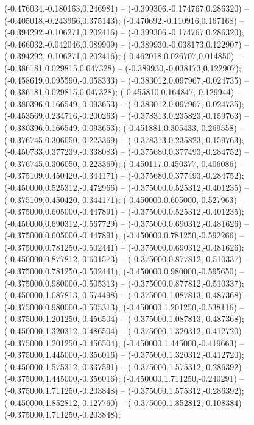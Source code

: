  (-0.476034,-0.180163,0.246981) -- (-0.399306,-0.174767,0.286320) -- (-0.405018,-0.243966,0.375143);
 (-0.470692,-0.110916,0.167168) -- (-0.394292,-0.106271,0.202416) -- (-0.399306,-0.174767,0.286320);
 (-0.466032,-0.042046,0.089909) -- (-0.389930,-0.038173,0.122907) -- (-0.394292,-0.106271,0.202416);
 (-0.462018,0.026707,0.014850) -- (-0.386181,0.029815,0.047328) -- (-0.389930,-0.038173,0.122907);
 (-0.458619,0.095590,-0.058333) -- (-0.383012,0.097967,-0.024735) -- (-0.386181,0.029815,0.047328);
 (-0.455810,0.164847,-0.129944) -- (-0.380396,0.166549,-0.093653) -- (-0.383012,0.097967,-0.024735);
 (-0.453569,0.234716,-0.200263) -- (-0.378313,0.235823,-0.159763) -- (-0.380396,0.166549,-0.093653);
 (-0.451881,0.305433,-0.269558) -- (-0.376745,0.306050,-0.223369) -- (-0.378313,0.235823,-0.159763);
 (-0.450733,0.377239,-0.338083) -- (-0.375680,0.377493,-0.284752) -- (-0.376745,0.306050,-0.223369);
 (-0.450117,0.450377,-0.406086) -- (-0.375109,0.450420,-0.344171) -- (-0.375680,0.377493,-0.284752);
 (-0.450000,0.525312,-0.472966) -- (-0.375000,0.525312,-0.401235) -- (-0.375109,0.450420,-0.344171);
 (-0.450000,0.605000,-0.527963) -- (-0.375000,0.605000,-0.447891) -- (-0.375000,0.525312,-0.401235);
 (-0.450000,0.690312,-0.567729) -- (-0.375000,0.690312,-0.481626) -- (-0.375000,0.605000,-0.447891);
 (-0.450000,0.781250,-0.592266) -- (-0.375000,0.781250,-0.502441) -- (-0.375000,0.690312,-0.481626);
 (-0.450000,0.877812,-0.601573) -- (-0.375000,0.877812,-0.510337) -- (-0.375000,0.781250,-0.502441);
 (-0.450000,0.980000,-0.595650) -- (-0.375000,0.980000,-0.505313) -- (-0.375000,0.877812,-0.510337);
 (-0.450000,1.087813,-0.574498) -- (-0.375000,1.087813,-0.487368) -- (-0.375000,0.980000,-0.505313);
 (-0.450000,1.201250,-0.538116) -- (-0.375000,1.201250,-0.456504) -- (-0.375000,1.087813,-0.487368);
 (-0.450000,1.320312,-0.486504) -- (-0.375000,1.320312,-0.412720) -- (-0.375000,1.201250,-0.456504);
 (-0.450000,1.445000,-0.419663) -- (-0.375000,1.445000,-0.356016) -- (-0.375000,1.320312,-0.412720);
 (-0.450000,1.575312,-0.337591) -- (-0.375000,1.575312,-0.286392) -- (-0.375000,1.445000,-0.356016);
 (-0.450000,1.711250,-0.240291) -- (-0.375000,1.711250,-0.203848) -- (-0.375000,1.575312,-0.286392);
 (-0.450000,1.852812,-0.127760) -- (-0.375000,1.852812,-0.108384) -- (-0.375000,1.711250,-0.203848);

